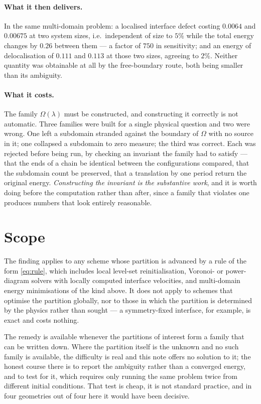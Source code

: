 \documentclass[11pt]{article}
\begin{document}
\paragraph{What it then delivers.} In the same multi-domain problem: a localised interface defect
costing $0.0064$ and $0.00675$ at two system sizes, i.e.\ independent of size to $5\%$ while the
total energy changes by $0.26$ between them --- a factor of $750$ in sensitivity; and an energy of
delocalisation of $0.111$ and $0.113$ at those two sizes, agreeing to $2\%$. Neither quantity was
obtainable at all by the free-boundary route, both being smaller than its ambiguity.

\paragraph{What it costs.} The family $\Omega(\lambda)$ must be constructed, and constructing it
correctly is not automatic. Three families were built for a single physical question and two were
wrong. One left a subdomain stranded against the boundary of $\Omega$ with no source in it; one
collapsed a subdomain to zero measure; the third was correct. Each was rejected before being run, by
checking an invariant the family had to satisfy --- that the ends of a chain be identical between
the configurations compared, that the subdomain count be preserved, that a translation by one period
return the original energy. \emph{Constructing the invariant is the substantive work}, and it is
worth doing before the computation rather than after, since a family that violates one produces
numbers that look entirely reasonable.

\section{Scope}

The finding applies to any scheme whose partition is advanced by a rule of the form
\eqref{eq:rule}, which includes local level-set reinitialisation, Voronoi- or power-diagram solvers
with locally computed interface velocities, and multi-domain energy minimisations of the kind
above. It does not apply to schemes that optimise the partition globally, nor to those in which the
partition is determined by the physics rather than sought --- a symmetry-fixed interface, for
example, is exact and costs nothing.

The remedy is available whenever the partitions of interest form a family that can be written down.
Where the partition itself is the unknown and no such family is available, the difficulty is real
and this note offers no solution to it; the honest course there is to report the ambiguity rather
than a converged energy, and to test for it, which requires only running the same problem twice from
different initial conditions. That test is cheap, it is not standard practice, and in four
geometries out of four here it would have been decisive.
\end{document}
